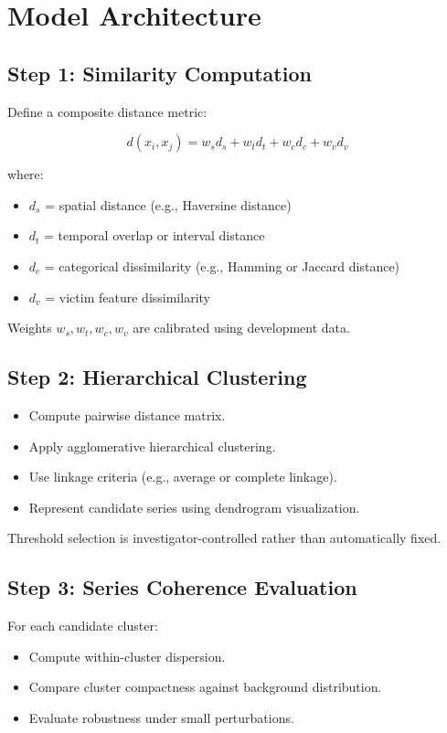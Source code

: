 \documentclass[12pt]{article}
\begin{document}
\section{Model Architecture}

\subsection{Step 1: Similarity Computation}

Define a composite distance metric:

\[
d(x_i, x_j) = w_s d_s + w_t d_t + w_c d_c + w_v d_v
\]

where:
\begin{itemize}
    \item $d_s$ = spatial distance (e.g., Haversine distance)
    \item $d_t$ = temporal overlap or interval distance
    \item $d_c$ = categorical dissimilarity (e.g., Hamming or Jaccard distance)
    \item $d_v$ = victim feature dissimilarity
\end{itemize}

Weights $w_s, w_t, w_c, w_v$ are calibrated using development data.

\subsection{Step 2: Hierarchical Clustering}

\begin{itemize}
    \item Compute pairwise distance matrix.
    \item Apply agglomerative hierarchical clustering.
    \item Use linkage criteria (e.g., average or complete linkage).
    \item Represent candidate series using dendrogram visualization.
\end{itemize}

Threshold selection is investigator-controlled rather than automatically fixed.

\subsection{Step 3: Series Coherence Evaluation}

For each candidate cluster:
\begin{itemize}
    \item Compute within-cluster dispersion.
    \item Compare cluster compactness against background distribution.
    \item Evaluate robustness under small perturbations.
\end{itemize}
\end{document}
